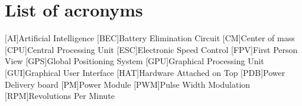 \chapter*{List of acronyms}
\begin{acronym} 
    [AI]{Artificial Intelligence}
    [BEC]{Battery Elimination Circuit}
    [CM]{Center of mass}
    [CPU]{Central Processing Unit}
    [ESC]{Electronic Speed Control}
    [FPV]{First Person View}
    [GPS]{Global Positioning System}
    [GPU]{Graphical Processing Unit}
    [GUI]{Graphical User Interface}
    [HAT]{Hardware Attached on Top}
    [PDB]{Power Delivery board}
    [PM]{Power Module}
    [PWM]{Pulse Width Modulation}
    [RPM]{Revolutions Per Minute}
\end{acronym}